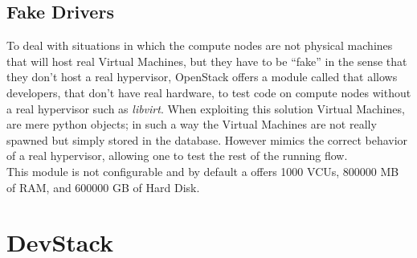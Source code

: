 \subsection{Fake Drivers}
\label{sec:openstack_fake_drivers}
To deal with situations in which the compute nodes are not physical machines that will host real Virtual Machines, but they have to be ``fake'' in the sense that they don't host a real hypervisor, OpenStack offers a module called  that allows developers, that don't have real hardware, to test  code on compute nodes without a real hypervisor such as \textit{libvirt}. When exploiting this solution Virtual Machines, are mere python objects; in such a way the Virtual Machines are not really spawned but simply stored in the database. However  mimics the correct behavior of a real hypervisor, allowing one to test the rest of the  running flow.\\
This module is not configurable and by default a  offers 1000 VCUs, 800000 MB of RAM, and 600000 GB of Hard Disk. 

\section{DevStack}
\label{sec:devstack}
 
